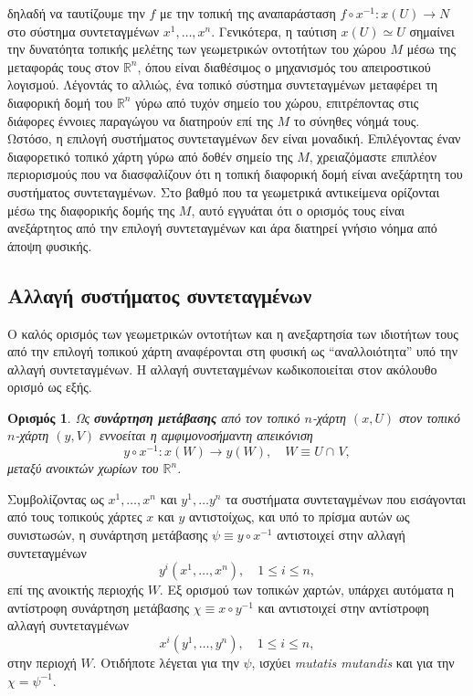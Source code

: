 \documentclass[11pt,a4paper,twoside,openright]{book}
\newtheorem{definition}[lemma]{Ορισμός}
\begin{document}
δηλαδή να ταυτίζουμε την $f$
με την τοπική της αναπαράσταση $f \circ x^{-1}: x(U) \to N$
στο σύστημα συντεταγμένων $x^1, \dots, x^n$.
Γενικότερα, η ταύτιση $x(U) \simeq U$
σημαίνει την δυνατόητα τοπικής μελέτης των γεωμετρικών οντοτήτων
του χώρου $M$ μέσω της μεταφοράς τους στον $\mathbb{R}^n$,
όπου είναι διαθέσιμος ο μηχανισμός του απειροστικού λογισμού.
Λέγοντάς το αλλιώς, ένα τοπικό σύστημα συντεταγμένων
μεταφέρει τη διαφορική
δομή του $\mathbb{R}^n$
γύρω από τυχόν σημείο του χώρου,
επιτρέποντας στις διάφορες έννοιες παραγώγου να
διατηρούν επί της $M$ το σύνηθες νόημά τους. Ωστόσο,
η επιλογή συστήματος συντεταγμένων δεν είναι μοναδική.
Επιλέγοντας έναν διαφορετικό τοπικό χάρτη γύρω από δοθέν σημείο της
$Μ$, χρειαζόμαστε επιπλέον περιορισμούς
που να διασφαλίζουν ότι
η τοπική διαφορική δομή
είναι ανεξάρτητη του συστήματος συντεταγμένων.
Στο βαθμό που τα γεωμετρικά αντικείμενα ορίζονται
μέσω της διαφορικής δομής της $M$,
αυτό εγγυάται ότι
ο ορισμός τους είναι ανεξάρτητος από
την επιλογή συντεταγμένων και άρα
διατηρεί γνήσιο νόημα από άποψη φυσικής.

\subsection{Αλλαγή συστήματος συντεταγμένων}
	\label{sec:change-of-coordinates}

Ο καλός ορισμός των γεωμετρικών οντοτήτων και η ανεξαρτησία των ιδιοτήτων τους από την επιλογή τοπικού χάρτη
αναφέρονται στη φυσική ως
``αναλλοιότητα'' υπό την αλλαγή συντεταγμένων.
Η αλλαγή συντεταγμένων κωδικοποιείται στον ακόλουθο ορισμό ως εξής.
\begin{definition}\label{def:transition-function}
Ως \textbf{συνάρτηση μετάβασης}
από τον τοπικό $n$-χάρτη $(x, U)$
στον τοπικό $n$-χάρτη $(y, V)$
εννοείται η αμφιμονοσήμαντη απεικόνιση
\begin{equation*}\label{eq:transition-function}
y \circ x^{-1}: x(W) \to y(W),
\quad
W \equiv U \cap \hspace{1pt} V,
\end{equation*}
μεταξύ ανοικτών χωρίων του $\mathbb{R}^n$.
\end{definition}
\noindent
Συμβολίζοντας ως $x^1, \dots, x^n$ και $y^1, \dots y^n$
τα συστήματα συντεταγμένων που εισάγονται από τους τοπικούς
χάρτες $x$ και $y$ αντιστοίχως,
και υπό το πρίσμα αυτών ως συνιστωσών,
η συνάρτηση μετάβασης $\psi \equiv y \circ x^{-1}$
αντιστοιχεί στην αλλαγή συντεταγμένων
\begin{equation}\label{eq:coordinates-change-x-to-y}
y^i(x^1, \dots, x^n),
\quad
1 \le i \le n,
\end{equation}
επί της ανοικτής περιοχής $W$.
Εξ ορισμού των τοπικών χαρτών,
υπάρχει αυτόματα η αντίστροφη συνάρτηση μετάβασης
$\chi \equiv x \circ y^{-1}$
και αντιστοιχεί στην αντίστροφη αλλαγή συντεταγμένων
\begin{equation}\label{eq:coordinates-change-y-to-x}
x^i(y^1, \dots, y^n),
\quad
1 \le i \le n,
\end{equation}
στην περιοχή $W$.
Οτιδήποτε λέγεται για την $\psi$, ισχύει \textit{mutatis mutandis} και για την $\chi = \psi ^ {-1}$.
\end{document}
